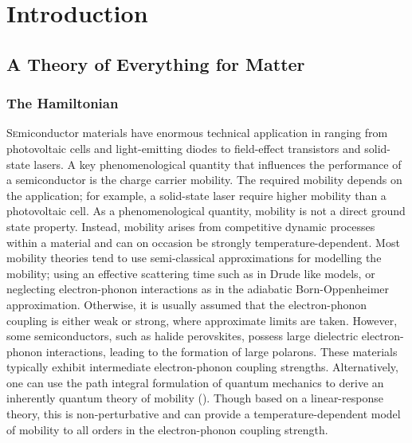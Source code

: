 \clearpage{}

\pagestyle{body}

\chapter{Introduction}
\label{chap:first}



\section{A Theory of Everything for Matter}
\label{sec:chap-first-first}

\subsection{The Hamiltonian}
\label{subsec:chap-first-first}

\lettrine{S}emiconductor materials have enormous technical application in ranging from photovoltaic cells and light-emitting diodes to field-effect transistors and solid-state lasers. A key phenomenological quantity that influences the performance of a semiconductor is the charge carrier mobility. The required mobility depends on the application; for example, a solid-state laser require higher mobility than a photovoltaic cell. As a phenomenological quantity, mobility is not a direct ground state property. Instead, mobility arises from competitive dynamic processes within a material and can on occasion be strongly temperature-dependent. Most mobility theories tend to use semi-classical approximations for modelling the mobility; using an effective scattering time such as in Drude like models, or neglecting electron-phonon interactions as in the adiabatic Born-Oppenheimer approximation. Otherwise, it is usually assumed that the electron-phonon coupling is either weak or strong, where approximate limits are taken. However, some semiconductors, such as halide perovskites, possess large dielectric electron-phonon interactions, leading to the formation of large polarons. These materials typically exhibit intermediate electron-phonon coupling strengths. Alternatively, one can use the path integral formulation of quantum mechanics to derive an inherently quantum theory of mobility (\cite{feynman_slow_1955, feynman_mobility_1962}). Though based on a linear-response theory, this is non-perturbative and can provide a temperature-dependent model of mobility to all orders in the electron-phonon coupling strength.